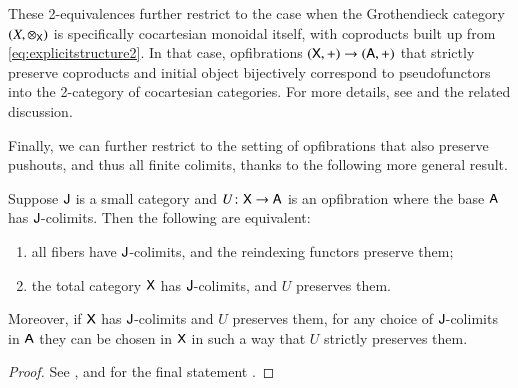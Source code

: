 \documentclass[reqno]{amsart}
\begin{document}
These 2-equivalences further restrict to the case when the Grothendieck category $(X,\otimes_{\mathsf{X}})$ is specifically cocartesian monoidal itself, with coproducts built up from \cref{eq:explicitstructure2}. In that case, opfibrations $(\mathsf{X},+) \to (\mathsf{A},+)$ that strictly preserve coproducts and initial object bijectively correspond to pseudofunctors into the 2-category of cocartesian categories.  For more details, see \cite[Corollary 4.7]{MV} and the related discussion.

Finally, we can further restrict to the setting of opfibrations that also preserve pushouts, and thus all finite colimits, thanks to the following more general result.

\begin{lem} \label{lem:fibrewiselimits}
Suppose $\mathsf{J}$ is a small category and $U \colon \mathsf{X} \to \mathsf{A}$ is an opfibration where the base $\mathsf{A}$ has $\mathsf{J}$-colimits.  Then the following are equivalent:
\begin{enumerate}
 \item all fibers have $\mathsf{J}$-colimits, and the reindexing functors preserve them;
 \item the total category $\mathsf{X}$ has $\mathsf{J}$-colimits, and $U$ preserves them.
\end{enumerate}
Moreover, if $\mathsf{X}$ has $\mathsf{J}$-colimits and $U$ preserves them, for any choice of $\mathsf{J}$-colimits in $\mathsf{A}$ they can be chosen in $\mathsf{X}$ in such a way that $U$ strictly preserves them.   
\end{lem}

\begin{proof}
See \cite[Corollary~4.9]{Hermida1999}, and for the final statement \cite[Remark~4.11]{Hermida1999}.
\end{proof}
\end{document}
